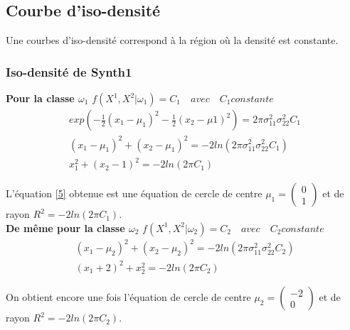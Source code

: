 \documentclass[10pt]{article}
\begin{document}
\subsection{Courbe d'iso-densité}
Une courbes d'iso-densité correspond à la région où la densité est constante.

\subsubsection{Iso-densité de Synth1}
\textbf{Pour la classe $\omega_{1}$} $f(X^{1}, X^{2}|\omega_{1}) = C_{1} \quad avec \quad C_{1} constante$
\begin{equation}
\begin{split}
exp(-\frac{1}{2} (x_{1}-\mu_{1})^{2} - \frac{1}{2}(x_{2} - \mu{1})^{2})  = 2 \pi \sigma_{11}^{2} \sigma_{22}^{2} C_{1}
\\
(x_{1} - \mu_{1})^{2} + (x_{2} - \mu_{1})^{2} = -2ln(2 \pi \sigma_{11}^{2} \sigma_{22}^{2} C_{1})
\\
x_{1}^{2} + (x_{2} - 1)^{2} = -2 ln(2\pi C_{1})
\end{split}
\label{7}
\end{equation}

 L'équation \eqref{5} obtenue est une équation de cercle de centre $\mu_{1} = \begin{pmatrix} 0 \\ 1\end{pmatrix} $ et de rayon $R^{2} = -2 ln(2\pi C_{1})$.\\
 
 \textbf{De même pour la classe $\omega_{2}$} $f(X^{1}, X^{2}|\omega_{2}) = C_{2} \quad avec \quad C_{2} constante$
 \begin{equation}
 \begin{split}
 (x_{1} - \mu_{2})^{2} + (x_{2} - \mu_{2})^{2} = -2ln(2 \pi \sigma_{11}^{2} \sigma_{22}^{2}C_{2}) 
 \\
 (x_{1} + 2)^{2} + x_{2}^{2} = -2ln(2\pi C_{2})
 \label{8}
\end{split}
 \end{equation}
 
 On obtient encore une fois l'équation de cercle de centre $\mu_{2} = \begin{pmatrix} -2 \\ 0\end{pmatrix} $ et de rayon $R^{2} = -2 ln(2\pi C_{2})$.\\
\end{document}
